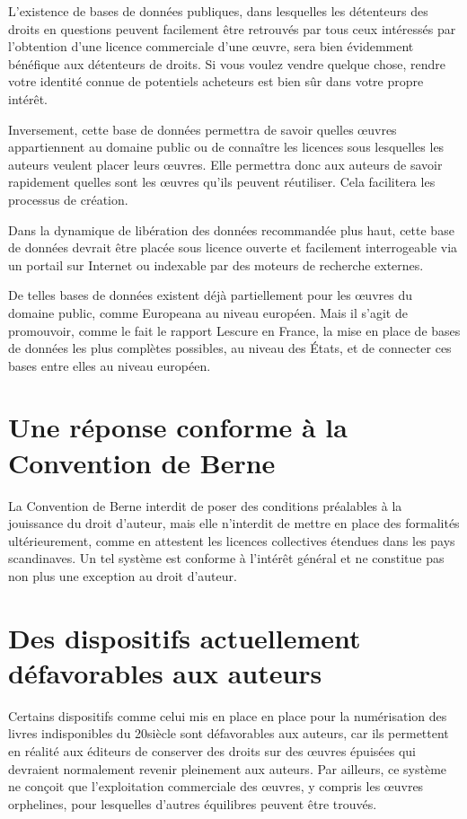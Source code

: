 L’existence de bases de données publiques, dans lesquelles les détenteurs des
droits en questions peuvent facilement être retrouvés par tous ceux intéressés par l’obtention d’une
licence commerciale d’une œuvre, sera bien évidemment bénéfique aux détenteurs de droits. Si vous
voulez vendre quelque chose, rendre votre identité connue de potentiels acheteurs est bien sûr dans
votre propre intérêt.

Inversement, cette base de données permettra de savoir quelles œuvres appartiennent au domaine public ou de connaître les licences sous lesquelles les auteurs veulent placer leurs œuvres. Elle permettra donc aux auteurs de savoir rapidement quelles sont les œuvres qu'ils peuvent réutiliser. Cela facilitera les processus de création.

Dans la dynamique de libération des données recommandée plus haut, cette base de données devrait être placée sous licence ouverte et facilement interrogeable via un portail sur Internet ou indexable par des moteurs de recherche externes.

De telles bases de données existent déjà partiellement pour les œuvres du domaine public, comme Europeana au niveau européen. Mais il s'agit de promouvoir, comme le fait le rapport Lescure en France, la mise en place de bases de données les plus complètes possibles, au niveau des États, et de connecter ces bases entre elles au niveau européen.  

\section{Une réponse conforme à la Convention de Berne}
La Convention de Berne interdit de poser des conditions préalables à la jouissance du droit d’auteur, mais elle n’interdit de mettre en place des formalités ultérieurement, comme en attestent les licences collectives étendues dans les pays scandinaves. Un tel système est conforme à l'intérêt général et ne constitue pas non plus une exception au droit d'auteur.

\section{Des dispositifs actuellement défavorables aux auteurs}

Certains dispositifs comme celui mis en place en place pour la numérisation des livres indisponibles du 20\ieme siècle sont défavorables aux auteurs, car ils permettent en réalité aux éditeurs de conserver des droits sur des œuvres épuisées qui devraient normalement revenir pleinement aux auteurs. Par ailleurs, ce système ne conçoit que l'exploitation commerciale des œuvres, y compris les œuvres orphelines, pour lesquelles d'autres équilibres peuvent être trouvés.

